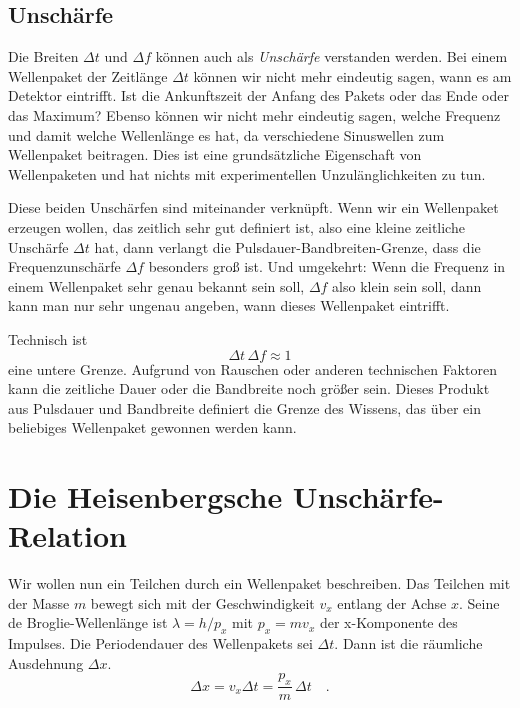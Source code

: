 \subsection{Unschärfe}

Die Breiten $\Delta t$ und $\Delta f$ können auch als \emph{Unschärfe} verstanden werden. Bei einem Wellenpaket der Zeitlänge $\Delta t$ können wir nicht mehr eindeutig sagen, wann es am Detektor eintrifft. Ist die Ankunftszeit der Anfang des Pakets oder das Ende oder das Maximum? Ebenso können wir nicht mehr eindeutig sagen, welche Frequenz und damit welche Wellenlänge es hat, da verschiedene Sinuswellen zum Wellenpaket beitragen. Dies ist eine grundsätzliche Eigenschaft von Wellenpaketen und hat nichts mit experimentellen Unzulänglichkeiten zu tun.

Diese beiden Unschärfen sind miteinander verknüpft. Wenn wir ein Wellenpaket erzeugen wollen, das zeitlich sehr gut definiert ist, also eine kleine zeitliche Unschärfe $\Delta t$ hat, dann verlangt die Pulsdauer-Bandbreiten-Grenze, dass die Frequenzunschärfe $\Delta f$ besonders groß ist. Und umgekehrt: Wenn die Frequenz in einem Wellenpaket sehr genau bekannt sein soll, $\Delta f$ also klein sein soll, dann kann man nur sehr ungenau angeben, wann dieses Wellenpaket eintrifft.

Technisch ist 
\begin{equation}
    \Delta t \, \Delta f \approx 1
\end{equation}
eine untere Grenze. Aufgrund von Rauschen oder anderen technischen Faktoren kann die zeitliche Dauer oder die Bandbreite noch größer sein. Dieses Produkt aus Pulsdauer und Bandbreite definiert die Grenze des Wissens, das über ein beliebiges Wellenpaket gewonnen werden kann.


\section{Die Heisenbergsche Unschärfe-Relation}

Wir wollen nun ein Teilchen durch ein Wellenpaket beschreiben. Das Teilchen mit der Masse $m$ bewegt sich mit der Geschwindigkeit $v_x$ entlang der Achse $x$. Seine de Broglie-Wellenlänge ist $\lambda = h / p_x$ mit $p_x = m v_x$ der x-Komponente des Impulses. Die Periodendauer des Wellenpakets sei $\Delta t$. Dann ist die räumliche Ausdehnung $\Delta x$.
\begin{equation}
    \Delta x = v_x \Delta t = \frac{p_x}{m} \, \Delta t \quad .
\end{equation}

